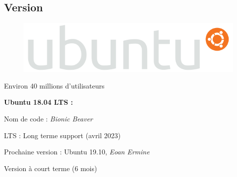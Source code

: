 \documentclass{beamer}
\begin{document}
\subsection*{Version}
\begin{frame}

\begin{figure}
\includegraphics[width=0.55\linewidth]{images/Ubuntu_logo}
\end{figure}

Environ 40 millions d'utilisateurs

\begin{block}{\bf Ubuntu 18.04 LTS :}

Nom de code : \textit{Bionic Beaver}

LTS : Long terme support (avril 2023)


\end{block}


\begin{exampleblock}{Prochaine version :}
 Ubuntu 19.10, \textit{Eoan Ermine}
 
 Version à court terme (6 mois)
\end{exampleblock}

\end{frame}
\end{document}
